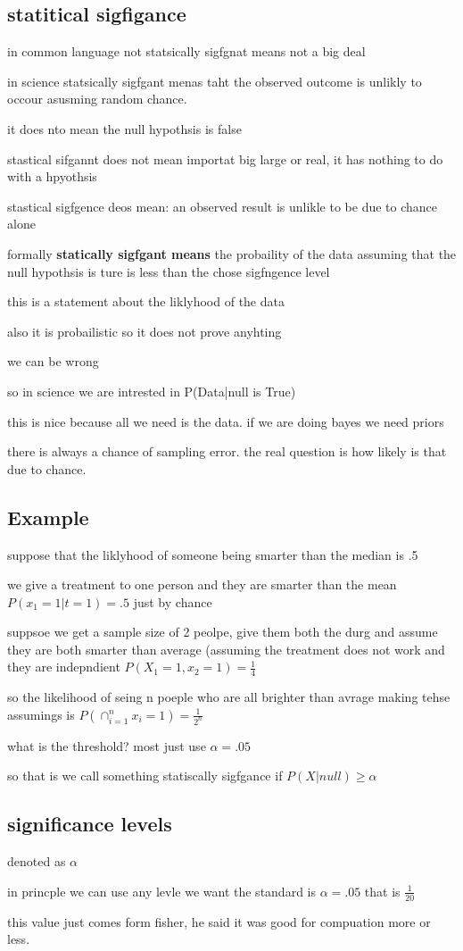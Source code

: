 \documentclass{article}
\begin{document}
\subsection{statitical sigfigance}
\item in common language not statsically sigfgnat means not a big deal 
\item in science statsically sigfgant menas taht the observed outcome is unlikly to occour asusming random chance. 
\item  it does nto mean the null hypothsis is false 
\item stastical sifgannt does not mean importat big large or real, it has nothing to do with a hpyothsis 
\item stastical sigfgence deos mean: an observed result is unlikle to be due to chance alone 
\item formally \textbf{statically sigfgant means} the probaility of the data assuming that the null hypothsis is ture is less than the chose sigfngence level
\item this is a statement about the liklyhood of the data
\item also it is probailistic so it does not prove anyhting 
\item we can be wrong 
\item so in science we are intrested in P(Data|null is True)
\item this is nice because all we need is the data. if we are doing bayes we need priors 
\item there is always a chance of sampling error. the real question is how likely is that due to chance. 
\subsection{Example}
\item suppose that the liklyhood of someone being smarter than the median is .5
\item we give a treatment to one person and they are smarter than the mean $P(x_1=1|t=1)=.5$ just by chance 
\item suppsoe we get a sample size of 2 peolpe, give them both the durg  and assume they are both smarter than average (assuming the treatment does not work and they are indepndient $P(X_1=1,x_2=1)=\frac{1}{4}$
\item so the likelihood of seing n poeple who are all brighter than avrage making tehse assumings is $P(\cap_{i=1}^{n}x_i=1)=\frac{1}{2^n}$
\item what is the threshold? most just use $\alpha=.05$
\item so that is we call something statiscally sigfgance if $P(X|null)\geq \alpha$
\subsection{significance levels}
\item denoted as $\alpha$
\item in princple we can use any levle we want the standard is $\alpha=.05$ that is $\frac{1}{20}$
\item this value just comes form fisher, he said it was good for compuation more or less. 
\end{document}
